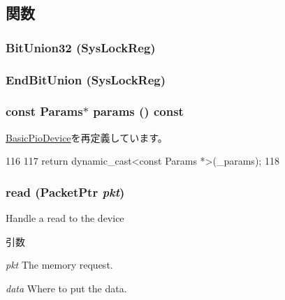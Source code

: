 \subsection{関数}
\hypertarget{classRealViewCtrl_a623e99eb6c307be3f314e3270a9c3193}{
\subsubsection[{BitUnion32}]{\setlength{\rightskip}{0pt plus 5cm}BitUnion32 (SysLockReg)}}
\label{classRealViewCtrl_a623e99eb6c307be3f314e3270a9c3193}
\hypertarget{classRealViewCtrl_ab3f7e7f4f53a9c536fc272a8baec0cfc}{
\subsubsection[{EndBitUnion}]{\setlength{\rightskip}{0pt plus 5cm}EndBitUnion (SysLockReg)}}
\label{classRealViewCtrl_ab3f7e7f4f53a9c536fc272a8baec0cfc}
\hypertarget{classRealViewCtrl_acd3c3feb78ae7a8f88fe0f110a718dff}{
\subsubsection[{params}]{\setlength{\rightskip}{0pt plus 5cm}const {\bf Params}$\ast$ params () const}}
\label{classRealViewCtrl_acd3c3feb78ae7a8f88fe0f110a718dff}


\hyperlink{classBasicPioDevice_acd3c3feb78ae7a8f88fe0f110a718dff}{BasicPioDevice}を再定義しています。


\begin{DoxyCode}
116     {
117         return dynamic_cast<const Params *>(_params);
118     }
\end{DoxyCode}
\hypertarget{classRealViewCtrl_a613ec7d5e1ec64f8d21fec78ae8e568e}{
\subsubsection[{read}]{ read ({\bf PacketPtr} {\em pkt})}}
\label{classRealViewCtrl_a613ec7d5e1ec64f8d21fec78ae8e568e}
Handle a read to the device 
\begin{DoxyParams}{引数}
\item[{\em pkt}]The memory request. \item[{\em data}]Where to put the data. \end{DoxyParams}



